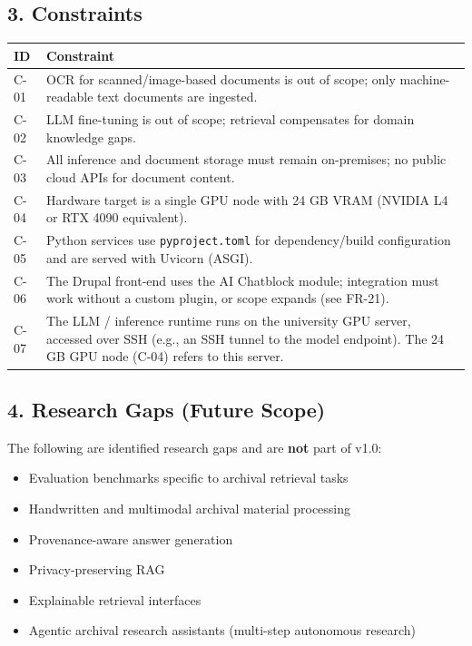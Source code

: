 \documentclass[
  11pt,
]{article}
\newcounter{none} %
\providecommand{\tightlist}{%
  \setlength{\itemsep}{0pt}\setlength{\parskip}{0pt}}
\begin{document}
\subsection{3. Constraints}\label{constraints}

{\def\LTcaptype{none} %
\begin{longtable}[]{@{}
  >{\raggedright\arraybackslash}p{}
  >{\raggedright\arraybackslash}p{}@{}}
\toprule\noalign{}
\begin{minipage}[b]{\linewidth}\raggedright
ID
\end{minipage} & \begin{minipage}[b]{\linewidth}\raggedright
Constraint
\end{minipage} \\
\midrule\noalign{}
\endhead
\bottomrule\noalign{}
\endlastfoot
C-01 & OCR for scanned/image-based documents is out of scope; only
machine-readable text documents are ingested. \\
C-02 & LLM fine-tuning is out of scope; retrieval compensates for domain
knowledge gaps. \\
C-03 & All inference and document storage must remain on-premises; no
public cloud APIs for document content. \\
C-04 & Hardware target is a single GPU node with 24 GB VRAM (NVIDIA L4
or RTX 4090 equivalent). \\
C-05 & Python services use \texttt{pyproject.toml} for dependency/build
configuration and are served with Uvicorn (ASGI). \\
C-06 & The Drupal front-end uses the AI Chatblock module; integration
must work without a custom plugin, or scope expands (see FR-21). \\
C-07 & The LLM / inference runtime runs on the university GPU server,
accessed over SSH (e.g., an SSH tunnel to the model endpoint). The 24 GB
GPU node (C-04) refers to this server. \\
\end{longtable}
}

\subsection{4. Research Gaps (Future
Scope)}\label{research-gaps-future-scope}

The following are identified research gaps and are \textbf{not} part of
v1.0:

\begin{itemize}
\tightlist
\item
  Evaluation benchmarks specific to archival retrieval tasks
\item
  Handwritten and multimodal archival material processing
\item
  Provenance-aware answer generation
\item
  Privacy-preserving RAG
\item
  Explainable retrieval interfaces
\item
  Agentic archival research assistants (multi-step autonomous research)
\end{itemize}
\end{document}
